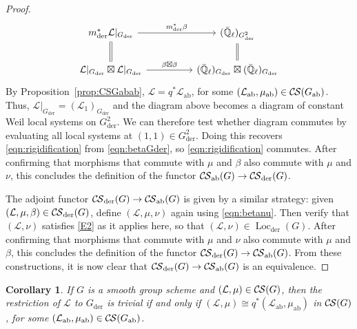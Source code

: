 \documentclass[10pt]{amsart}
\theoremstyle{plain}
\newtheorem{corollary}[theorem]{Corollary}
\theoremstyle{definition}
\newcommand{\EE}{\mathbb{\bar Q}_\ell}
\DeclareMathOperator{\Loc}{Loc}
\newcommand{\der}{_{\operatorname{der}}}
\newcommand{\ab}{_{\operatorname{ab}}}
\newcommand{\cs}[1]{{\mathcal{#1}}}
\newcommand{\CS}{{\mathcal{C\hskip-0.8pt S}}}
\begin{document}
\begin{proof}
\begin{equation}\label{eqn:betaGder}
\begin{tikzcd}
m\der^*\cs{L}\vert_{G\der} \arrow{rr}{m\der^* \beta} \arrow[equal]{d} && \arrow[equal]{d} (\EE)_{G\der^2}\\
\cs{L}\vert_{G\der} \boxtimes \cs{L}\vert_{G\der} \arrow{rr}{\beta\boxtimes\beta} &&  (\EE)_{G\der}\boxtimes (\EE)_{G\der} 
\end{tikzcd}
\end{equation}
By Proposition~\ref{prop:CSGabab}, $\cs{L} = q^*\cs{L}\ab$, for some $(\cs{L}\ab,\mu\ab)\in \CS(G\ab)$.
Thus, $\cs{L}\vert_{G\der} = (\cs{L}_1)_{G\der}$ and the diagram above becomes a diagram of constant Weil local systems on $G\der^2$.
We can therefore test  whether  diagram commutes by evaluating all local systems at $(1,1)\in G\der^2$.  Doing this recovers \eqref{eqn:rigidification} from \eqref{eqn:betaGder}, so \eqref{eqn:rigidification} commutes.
%
After confirming that morphisms that commute with $\mu$ and $\beta$ also commute with $\mu$ and $\nu$, this concludes the definition of the functor  $\CS\ab(G) \to \CS\der(G)$.


The adjoint functor $\CS\der(G) \to \CS\ab(G)$ is given by a  similar  strategy: given $(\cs{L},\mu,\beta)\in \CS\der(G)$, define $(\cs{L},\mu,\nu)$ again using  \eqref{eqn:betanu}.
Then verify that $(\cs{L},\nu)$ satisfies \eqref{E2} as it applies here, so that $(\cs{L},\nu)\in \Loc\der(G)$.
After confirming that morphisms that commute with $\mu$ and $\nu$ also commute with $\mu$ and $\beta$, this concludes the definition of the functor  $\CS\der(G) \to \CS\ab(G)$.
From these constructions,  it is now clear that $\CS\der(G) \to \CS\ab(G)$ is an equivalence.
\end{proof}

\begin{corollary} 
If $G$ is a smooth group scheme and $(\cs{L},\mu) \in \CS(G)$, then
the restriction of $\cs{L}$ to $G\der$ is trivial if and only if $(\cs{L},\mu) \cong q^*(\cs{L}\ab,\mu\ab)$ in $\CS(G)$, for some $(\cs{L}\ab,\mu\ab) \in \CS(G\ab)$.
\end{corollary}
\end{document}
